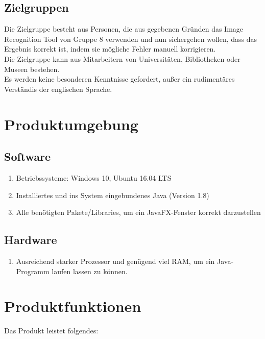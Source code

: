 \documentclass[10pt, paper = a4, oneside,final]{article}
\begin{document}
\subsection{Zielgruppen}
Die Zielgruppe besteht aus Personen, die aus gegebenen Gründen das Image Recognition Tool von Gruppe 8 verwenden und nun sichergehen wollen, dass das Ergebnis korrekt ist, indem sie mögliche Fehler manuell korrigieren. \\
Die Zielgruppe kann aus Mitarbeitern von Universitäten, Bibliotheken oder Museen bestehen.\\
Es werden keine besonderen Kenntnisse gefordert, außer ein rudimentäres Verständis der englischen Sprache.
 
 \section{Produktumgebung}
 \subsection{Software}
 \begin{enumerate}[label=$\circ$]
 	\item Betriebssysteme: Windows 10, Ubuntu 16.04 LTS
	\item Installiertes und ins System eingebundenes Java (Version 1.8)
	\item Alle benötigten Pakete/Libraries, um ein JavaFX-Fenster korrekt darzustellen
 \end{enumerate}

\subsection{Hardware}
\begin{enumerate}[label=$\circ$]
	\item Ausreichend starker Prozessor und genügend viel RAM, um ein Java-Programm laufen lassen zu können.
\end{enumerate}

\section{Produktfunktionen}
Das Produkt leistet folgendes:
\end{document}
